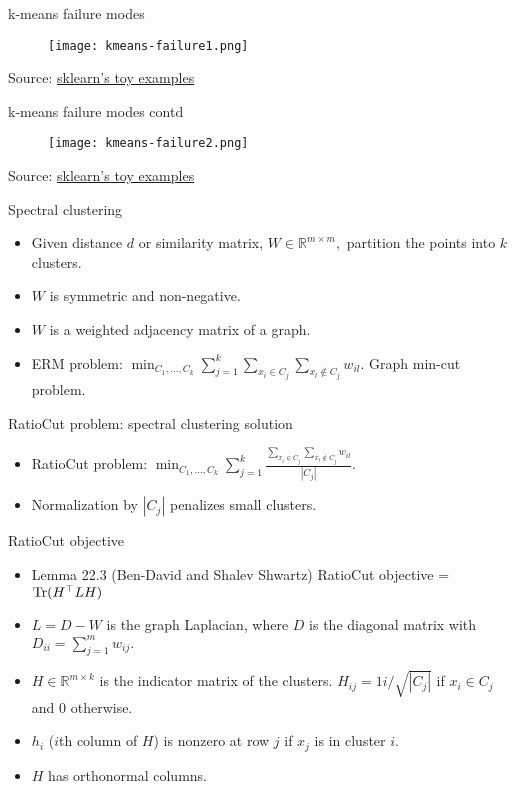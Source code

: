 \documentclass[final]{beamer}
\begin{document}
\begin{frame}{k-means failure modes}
	\begin{figure}
		\texttt{[image: kmeans-failure1.png]}
\end{figure}
	Source: \href{https://scikit-learn.org/stable/auto_examples/cluster/plot_kmeans_assumptions.html\#sphx-glr-auto-examples-cluster-plot-kmeans-assumptions-py}{sklearn's toy examples}
\end{frame}
\begin{frame}{k-means failure modes contd}
	\begin{figure}
	\texttt{[image: kmeans-failure2.png]}
	\end{figure}

	Source: \href{https://scikit-learn.org/stable/auto_examples/cluster/plot_kmeans_assumptions.html\#sphx-glr-auto-examples-cluster-plot-kmeans-assumptions-py}{sklearn's toy examples}
\end{frame}
\begin{frame}{Spectral clustering}
	\begin{itemize}
		\item Given distance $d$ or similarity matrix, $W \in \mathbb{R}^{m\times m},$ partition the points into $k$ clusters.
		\pause
		\item $W$ is symmetric and non-negative.
		\pause
		\item $W$ is a weighted adjacency matrix of a graph.
		\pause
		\item ERM problem: $\min_{C_1, \ldots, C_k} \sum_{j=1}^k \sum_{x_i \in C_j} \sum_{x_l \notin C_j} w_{il}.$ Graph min-cut problem.
	\end{itemize}
\end{frame}
\begin{frame}{RatioCut problem: spectral clustering solution}
	\begin{itemize}
		\item RatioCut problem: $\min_{C_1, \ldots, C_k} \sum_{j=1}^k \frac{\sum_{x_i \in C_j} \sum_{x_l \notin C_j} w_{il}}{|C_j|}.$
		\pause
		\item Normalization by $|C_j|$ penalizes small clusters.
		\pause

	\end{itemize}

\end{frame}
\begin{frame}{RatioCut objective}
	\begin{itemize}
\item Lemma 22.3 (Ben-David and Shalev Shwartz) RatioCut objective = ${\rm Tr}(H^\top L H)$
\pause
	\item $L = D - W$ is the graph Laplacian, where $D$ is the diagonal matrix with $D_{ii} = \sum_{j=1}^m w_{ij}.$
	\pause
\item $H \in \mathbb{R}^{m\times k}$ is the indicator matrix of the clusters. $H_{ij} = 1i/\sqrt{|C_j|}$ if $x_i \in C_j$ and $0$ otherwise.
	\pause
	\item $h_i$ ($i$th column of $H$) is nonzero at row $j$ if $x_j$ is in cluster $i$. 
	\pause
	\item $H$ has orthonormal columns.
	\end{itemize}
\end{frame}
\end{document}
